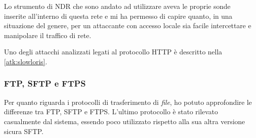 Lo strumento di NDR che sono andato ad utilizzare aveva le proprie sonde inserite all'interno di questa rete e mi ha permesso di capire quanto, in una situazione del genere, per un attaccante con accesso locale sia facile intercettare e manipolare il traffico di rete.

Uno degli attacchi analizzati legati al protocollo HTTP è descritto nella \autoref{atk:slowloris}.

\subsubsection{FTP, SFTP e FTPS}

Per quanto riguarda i protocolli di trasferimento di \emph{file}, ho potuto approfondire le differenze tra FTP, SFTP e FTPS. L'ultimo protocollo è stato rilevato casualmente dal sistema, essendo poco utilizzato rispetto alla sua altra versione sicura SFTP.

